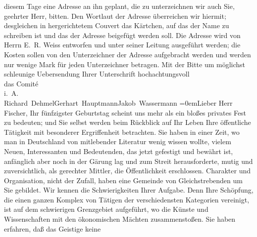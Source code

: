 \begin{ledgroupsized}[t]{13cm}
               diesem Tage eine Adresse an ihn geplant, die zu unterzeichnen wir auch Sie, geehrter
               Herr, bitten. Den Wortlaut der Adresse überreichen wir hiermit; desgleichen in
               hergerichtetem Couvert das Kärtchen, auf das der Name zu schreiben ist und das der
               Adresse beigefügt werden soll. Die Adresse wird von Herrn E. R. Weiss entworfen und unter seiner Leitung ausgeführt
               werden; die Kosten sollen von den Unterzeichner der Adresse aufgebracht werden und
               werden nur wenige Mark für jeden Unterzeichner betragen.\pend
           \pstart
           Mit der Bitte um möglichst schleunige Uebersendung Ihrer Unterschrift\pend
           \pstart
           hochachtungsvoll{\\[\baselineskip]}das Comité{\\[\baselineskip]}i. A.{\\[\baselineskip]}\spacefill\mbox{Richard Dehmel\hspace*{1.5em}Gerhart Hauptmann\hspace*{1.5em}Jakob Wassermann}\pend
           \leftskip=0em{}\pstart{}{\pb}Lieber Herr Fischer,\pend\pstart
           Ihr fünfzigster Geburtstag scheint uns mehr als ein bloßes privates Fest zu bedeuten;
               und Sie selbst werden beim Rückblick auf Ihr Leben Ihre öffentliche Tätigkeit mit
               besonderer Ergriffenheit betrachten. Sie haben in einer Zeit, wo man in Deutschland von mitlebender Literatur wenig wissen
               wollte, vielem Neuen, Interessanten und Bedeutenden, das jetzt gefestigt und bewährt
               ist, anfänglich aber noch in der Gärung lag und zum Streit herausforderte, mutig und
               zuversichtlich, als gerechter Mittler, die Öffentlichkeit erschlossen. Charakter und
               Organisation, nicht der Zufall, haben eine Gemeinde von Gleichstrebenden um Sie
               gebildet. Wir kennen die Schwierigkeiten Ihrer Aufgabe. Denn Ihre Schöpfung, die
               einen ganzen Komplex von Tätigen der verschiedensten Kategorien vereinigt, ist auf
               dem schwierigen Grenzgebiet aufgeführt, wo die Künste und Wissenschaften mit den
               ökonomischen Mächten zusammenstoßen. Sie haben erfahren, daß das Geistige keine

\end{ledgroupsized}
